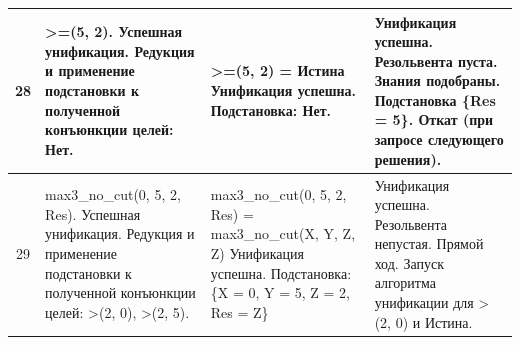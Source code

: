 \begin{tabularx}{\textwidth}{|c|>{\small}X|>{\small}X|>{\small}X|}
	28                                                                                 &
	>=(5, 2). \newline
	Успешная унификация. \newline
	Редукция и применение подстановки к полученной конъюнкции целей: \newline
	Нет.                                                                               &
	>=(5, 2) = \newline
	Истина \newline
	Унификация успешна. \newline
	Подстановка: \newline
	Нет.                                                                               &
	Унификация успешна. \newline
	Резольвента пуста. \newline
	Знания подобраны. Подстановка \{Res = 5\}. \newline
	Откат (при запросе следующего решения).                                                      \\
	\hline

	29                                                                                 &
	max3\_no\_cut(0, 5, 2, Res). \newline
	Успешная унификация. \newline
	Редукция и применение подстановки к полученной конъюнкции целей: \newline
	>(2, 0), \newline
	>(2, 5).                                                                           &
	max3\_no\_cut(0, 5, 2, Res) = max3\_no\_cut(X, Y, Z, Z) \newline
	Унификация успешна. \newline
	Подстановка: \newline
	\{X = 0, Y = 5, Z = 2, Res = Z\}                                                   &
	Унификация успешна. \newline
	Резольвента непустая. \newline
	Прямой ход. \newline
	Запуск алгоритма унификации для >(2, 0) и Истина.                                            \\
	\hline


\end{tabularx}
